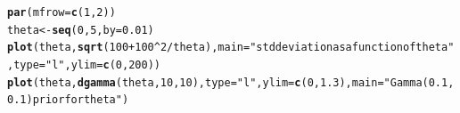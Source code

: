 \documentclass[12pt]{article}\usepackage[]{graphicx}\usepackage[]{color}
\makeatletter
\newcommand{\hlnum}[1]{\textcolor[rgb]{0.686,0.059,0.569}{#1}}%
\newcommand{\hlstr}[1]{\textcolor[rgb]{0.192,0.494,0.8}{#1}}%
\newcommand{\hlopt}[1]{\textcolor[rgb]{0,0,0}{#1}}%
\newcommand{\hlstd}[1]{\textcolor[rgb]{0.345,0.345,0.345}{#1}}%
\newcommand{\hlkwb}[1]{\textcolor[rgb]{0.69,0.353,0.396}{#1}}%
\newcommand{\hlkwc}[1]{\textcolor[rgb]{0.333,0.667,0.333}{#1}}%
\newcommand{\hlkwd}[1]{\textcolor[rgb]{0.737,0.353,0.396}{\textbf{#1}}}%
\newenvironment{kframe}{%
 \def\at@end@of@kframe{}%
 \ifinner\ifhmode%
  \def\at@end@of@kframe{\end{minipage}}%
  \begin{minipage}{\columnwidth}%
 \fi\fi%
 \def\FrameCommand##1{\hskip\@totalleftmargin \hskip-\fboxsep
 \colorbox{shadecolor}{##1}\hskip-\fboxsep
     \hskip-\linewidth \hskip-\@totalleftmargin \hskip\columnwidth}%
 \MakeFramed {\advance\hsize-\width
   \@totalleftmargin\z@ \linewidth\hsize
   \@setminipage}}%
 {\par\unskip\endMakeFramed%
 \at@end@of@kframe}
\newenvironment{knitrout}{}{} %
\makeatother
\begin{document}
\begin{knitrout}\footnotesize
{}\color{fgcolor}\begin{kframe}
\begin{alltt}
\hlkwd{par}\hlstd{(}\hlkwc{mfrow}\hlstd{=}\hlkwd{c}\hlstd{(}\hlnum{1}\hlstd{,}\hlnum{2}\hlstd{))}
\hlstd{theta} \hlkwb{<-} \hlkwd{seq}\hlstd{(}\hlnum{0}\hlstd{,} \hlnum{5}\hlstd{,} \hlkwc{by}\hlstd{=}\hlnum{0.01}\hlstd{)}
\hlkwd{plot}\hlstd{(theta,} \hlkwd{sqrt}\hlstd{(}\hlnum{100}\hlopt{+}\hlnum{100}\hlopt{^}\hlnum{2}\hlopt{/}\hlstd{theta),} \hlkwc{main}\hlstd{=}\hlstr{"std deviation as a function of theta"}\hlstd{,} \hlkwc{type}\hlstd{=}\hlstr{"l"}\hlstd{,} \hlkwc{ylim}\hlstd{=}\hlkwd{c}\hlstd{(}\hlnum{0}\hlstd{,} \hlnum{200}\hlstd{))}
\hlkwd{plot}\hlstd{(theta,} \hlkwd{dgamma}\hlstd{(theta,} \hlnum{10}\hlstd{,} \hlnum{10}\hlstd{),} \hlkwc{type}\hlstd{=}\hlstr{"l"}\hlstd{,} \hlkwc{ylim}\hlstd{=}\hlkwd{c}\hlstd{(}\hlnum{0}\hlstd{,} \hlnum{1.3}\hlstd{),} \hlkwc{main}\hlstd{=}\hlstr{"Gamma(0.1, 0.1) prior for theta"}\hlstd{)}
\end{alltt}
\end{kframe}
\end{knitrout}
\end{document}
